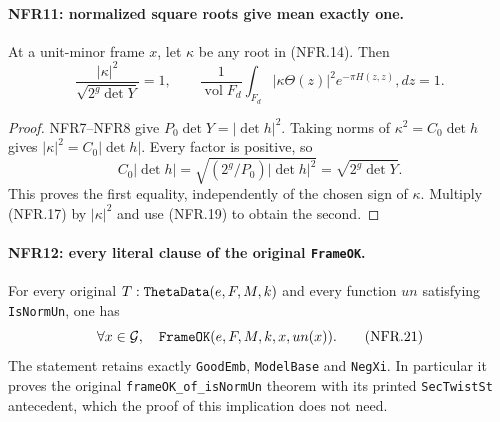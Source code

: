 \documentclass[11pt,a4paper]{article}
\numberwithin{equation}{section}
\theoremstyle{remark}\newtheorem{remark}[theorem]{Remark}
\begin{document}
\paragraph{NFR11: normalized square roots give mean exactly one.}
\label{claim:NFR11}
At a unit-minor frame $x$, let $\kappa$ be any root in (NFR.14).
Then
\[
 \frac{|\kappa|^2}{\sqrt{2^g\det Y}}=1,\qquad
 \frac1{\operatorname{vol}F_d}\int_{F_d}
  |\kappa\Theta(z)|^2e^{-\pi H(z,z)},dz=1.            \tag{NFR.20}
\]

\begin{proof}
NFR7--NFR8 give $P_0\det Y=|\det h|^2$.
Taking norms of $\kappa^2=C_0\det h$ gives
$|\kappa|^2=C_0|\det h|$.
Every factor is positive, so
\[
 C_0|\det h|=\sqrt{(2^g/P_0)|\det h|^2}
                        =\sqrt{2^g\det Y}.
\]
This proves the first equality, independently of the chosen sign
of $\kappa$.  Multiply (NFR.17) by $|\kappa|^2$ and use
(NFR.19) to obtain the second.
\end{proof}

\paragraph{NFR12: every literal clause of the original \texttt{Frame\allowbreak OK}.}
\label{claim:NFR12}
For every original $T:\texttt{Theta\allowbreak Data}(e,F,M,k)$ and every
function $un$ satisfying \texttt{Is\allowbreak Norm\allowbreak Un}, one has
\[
                  \forall x\in\mathcal G,\quad
                     \texttt{Frame\allowbreak OK}(e,F,M,k,x,un(x)).
 \tag{NFR.21}
\]
The statement retains exactly \texttt{Good\allowbreak Emb}, \texttt{Model\allowbreak Base}
and \texttt{Neg\allowbreak Xi}.  In particular it proves the original
\texttt{frame\allowbreak OK\_\allowbreak of\_\allowbreak is\allowbreak Norm\allowbreak Un} theorem with its printed
\texttt{Sec\allowbreak Twist\allowbreak St} antecedent, which the proof of this implication
does not need.
\end{document}
